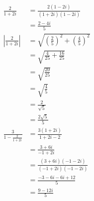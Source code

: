 \documentclass{article}
\begin{document}
\begin{align*}
  \frac{2}{1 + 2 i}                & = \frac{2 (1 - 2 i)}{(1 + 2 i) (1 - 2 i)}                            \\
                                   & = \frac{2 - 4 i}{5}                                                  \\
  \left| \frac{2}{1 + 2 i} \right| & = \sqrt{\left( \frac{2}{5} \right)^2 + \left( \frac{4}{5} \right)^2} \\
                                   & = \sqrt{\frac{4}{25} + \frac{16}{25}}                                \\
                                   & = \sqrt{\frac{20}{25}}                                               \\
                                   & = \sqrt{\frac{4}{5}}                                                 \\
                                   & = \frac{2}{\sqrt{5}}                                                 \\
                                   & = \frac{2 \sqrt{5}}{5}                                               \\
  \frac{3}{1 - \frac{2}{1 + 2 i}}  & = \frac{3 (1 + 2 i)}{1 + 2 i - 2}                                    \\
                                   & = \frac{3 + 6 i}{-1 + 2 i}                                           \\
                                   & = \frac{(3 + 6 i) (-1 - 2 i)}{(-1 + 2 i) (-1 - 2 i)}                 \\
                                   & = \frac{-3 - 6 i - 6 i + 12}{5}                                      \\
                                   & = \frac{9 - 12 i}{5}
\end{align*}

\setcounter{subsubsection}{20}
\subsubsection{}
\end{document}
